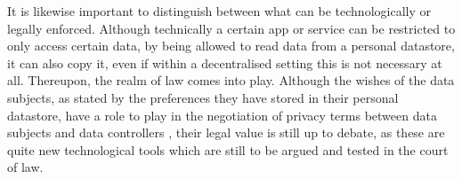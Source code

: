 
It is likewise important to distinguish between what can be technologically or legally enforced.
Although technically a certain app or service can be restricted to only access certain data, by being allowed to read data from a personal datastore, it can also copy it, even if within a decentralised setting this is not necessary at all.
Thereupon, the realm of law comes into play.
Although the wishes of the data subjects, as stated by the preferences they have stored in their personal datastore, have a role to play in the negotiation of privacy terms between data subjects and data controllers \citep{verborgh_paradigm_2017}, their legal value is still up to debate, as these are quite new technological tools which are still to be argued and tested in the court of law.